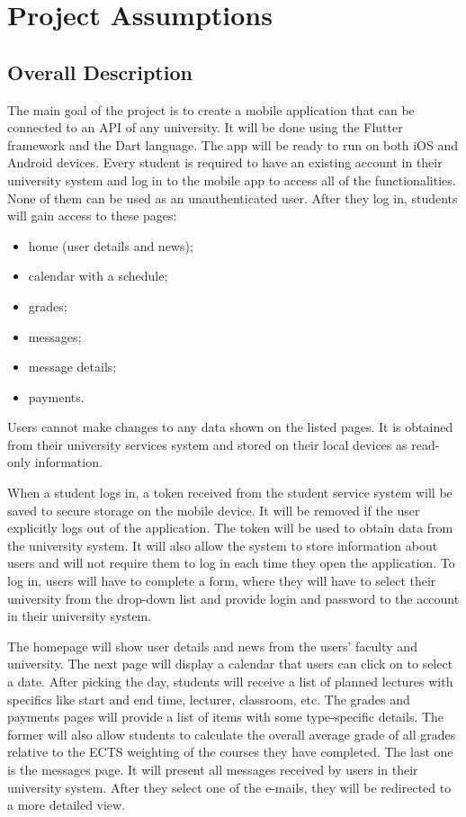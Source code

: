 \chapter{Project Assumptions}
\section{Overall Description}

The main goal of the project is to create a mobile application that can be connected to an API of any university. It will be done using the Flutter framework and the Dart language. The app will be ready to run on both iOS and Android devices. Every student is required to have an existing account in their university system and log in to the mobile app to access all of the functionalities. None of them can be used as an unauthenticated user. After they log in, students will gain access to these pages:

\begin{multicols}{2}
\begin{itemize}
    \item home (user details and news);
    \item calendar with a schedule;
    \item grades;
    \item messages;
    \item message details;
    \item payments.
\end{itemize}
\end{multicols}

Users cannot make changes to any data shown on the listed pages. It is obtained from their university services system and stored on their local devices as read-only information.

When a student logs in, a token received from the student service system will be saved to secure storage on the mobile device. It will be removed if the user explicitly logs out of the application. The token will be used to obtain data from the university system. It will also allow the system to store information about users and will not require them to log in each time they open the application. To log in, users will have to complete a form, where they will have to select their university from the drop-down list and provide login and password to the account in their university system.

The homepage will show user details and news from the users' faculty and university. The next page will display a calendar that users can click on to select a date. After picking the day, students will receive a list of planned lectures with specifics like start and end time, lecturer, classroom, etc. The grades and payments pages will provide a list of items with some type-specific details. The former will also allow students to calculate the overall average grade of all grades relative to the ECTS weighting of the courses they have completed. The last one is the messages page. It will present all messages received by users in their university system. After they select one of the e-mails, they will be redirected to a more detailed view.

